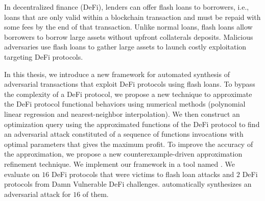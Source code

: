 In decentralized finance (DeFi), lenders can offer flash loans to
borrowers, i.e., loans that are only valid within a blockchain transaction
and must be repaid with some fees by the end of that transaction. Unlike
normal loans, flash loans allow borrowers to borrow large assets
without upfront collaterals deposits. Malicious adversaries use flash loans
to gather large assets to launch costly 
exploitation targeting DeFi protocols. 

In this thesis, we introduce a new framework for automated synthesis of
adversarial transactions that exploit DeFi protocols using flash loans. To
bypass the complexity of a DeFi protocol, we propose a new technique to
approximate the DeFi protocol functional behaviors using numerical methods 
(polynomial linear regression and nearest-neighbor interpolation). 
We then construct an optimization query using the approximated functions 
of the DeFi protocol to find an adversarial attack constituted of a sequence of 
functions invocations with optimal parameters that gives the maximum profit. 
To improve the accuracy of the approximation, we propose a new 
counterexample-driven approximation refinement technique. 
We implement our framework in a tool named {\name}. 
We evaluate {\name} on $16$ DeFi protocols that were
victims to flash loan attacks and $2$ DeFi protocols from Damn Vulnerable DeFi
challenges. {\name} automatically synthesizes an adversarial attack for
$16$ of them. 